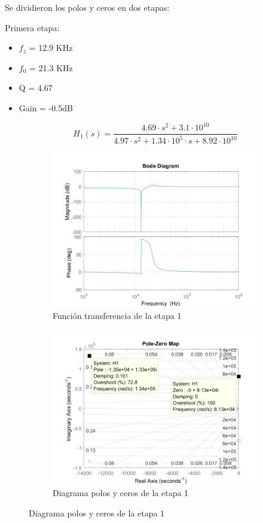 \documentclass[../../tc_tp5_main.tex]{subfiles}
\begin{document}
Se dividieron los polos y ceros en dos etapas:

Primera etapa:
\begin{itemize}
	\item $f_z$ = 12.9 KHz
	\item $f_0$ = 21.3 KHz
	\item Q = 4.67
	\item Gain = -0.5dB
\end{itemize}

\begin{equation}
H_1(s) = \frac{4.69\cdot s^2+3.1\cdot 10^{10}}{4.97\cdot s^2+1.34\cdot 10^5\cdot s + 8.92\cdot 10^{10}}
\end{equation}

\begin{figure}[H]	%
	\centering
	\begin{subfigure}[t]{0.7\textwidth}
		\centering
		\includegraphics[width=\textwidth]{imagenes/bode_etapa_1_calculo_pablo.png}
		\caption{Funci\'on transferencia de la etapa 1}
		\label{fig:ej3_H1_ideal}
	\end{subfigure}%
	\hfill%
	\begin{subfigure}[t]{0.7\textwidth}
		\centering
		\includegraphics[width=\textwidth]{imagenes/pz_etapa_1.png}
		\caption{Diagrama polos y ceros de la etapa 1}
		\label{fig:ej3_pz_etapa_1}
	\end{subfigure}
\end{figure}
\end{document}
